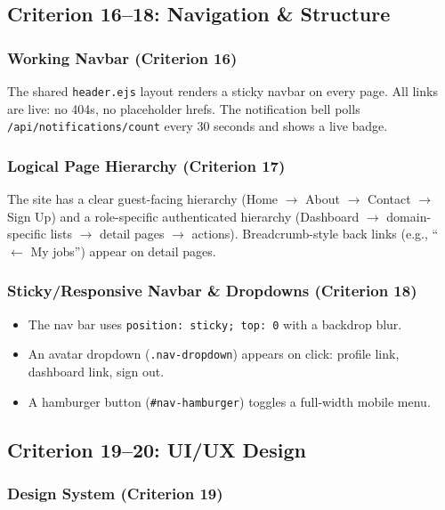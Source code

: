 \documentclass[12pt,a4paper]{article}
\begin{document}
\subsection{Criterion 16--18: Navigation \& Structure}

\subsubsection{Working Navbar (Criterion 16)}

The shared \texttt{header.ejs} layout renders a sticky navbar on every page. All links are live: no 404s, no placeholder hrefs. The notification bell polls \texttt{/api/notifications/count} every 30 seconds and shows a live badge.

\subsubsection{Logical Page Hierarchy (Criterion 17)}

The site has a clear guest-facing hierarchy (Home $\to$ About $\to$ Contact $\to$ Sign Up) and a role-specific authenticated hierarchy (Dashboard $\to$ domain-specific lists $\to$ detail pages $\to$ actions). Breadcrumb-style back links (e.g., ``$\leftarrow$ My jobs'') appear on detail pages.

\subsubsection{Sticky/Responsive Navbar \& Dropdowns (Criterion 18)}

\begin{itemize}[noitemsep]
  \item The nav bar uses \texttt{position: sticky; top: 0} with a backdrop blur.
  \item An avatar dropdown (\texttt{.nav-dropdown}) appears on click: profile link, dashboard link, sign out.
  \item A hamburger button (\texttt{\#nav-hamburger}) toggles a full-width mobile menu.
\end{itemize}

\subsection{Criterion 19--20: UI/UX Design}

\subsubsection{Design System (Criterion 19)}
\end{document}
